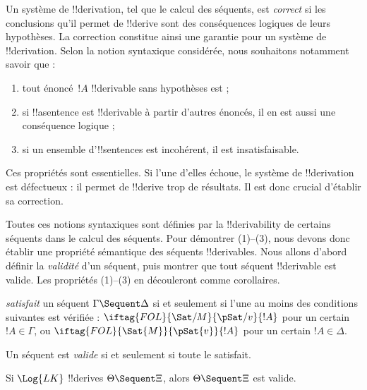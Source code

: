 \documentclass[../../../include/open-logic-section]{subfiles}
\begin{document}
      {}
      {}


\begin{explain}
Un système de !!{derivation}, tel que le calcul des séquents, est
\emph{correct} si les conclusions qu'il permet de !!{derive} sont
des conséquences logiques de leurs hypothèses. La correction constitue
ainsi une garantie pour un système de !!{derivation}. Selon la notion syntaxique
considérée, nous souhaitons notamment savoir que :
\begin{enumerate}
\item tout énoncé~$!A$ !!{derivable} sans hypothèses est
   ;
\item si !!a{sentence} est !!{derivable} à partir d'autres énoncés,
  il en est aussi une conséquence logique ;
\item si un ensemble d'!!{sentence}s est incohérent, il est insatisfaisable.
\end{enumerate}
Ces propriétés sont essentielles. Si l'une d'elles échoue, le système
de !!{derivation} est défectueux : il permet de !!{derive} trop de
résultats. Il est donc crucial d'établir sa correction.

Toutes ces notions syntaxiques sont définies par la !!{derivability}
de certains séquents dans le calcul des séquents. Pour démontrer
(1)--(3), nous devons donc établir une propriété sémantique des
séquents !!{derivable}s. Nous allons d'abord définir la \emph{validité}
d'un séquent, puis montrer que tout séquent !!{derivable} est valide.
Les propriétés (1)--(3) en découleront comme corollaires.
\end{explain}

\begin{defn}
\emph{satisfait} un séquent $\Gamma \Sequent \Delta$ si et seulement
si l'une au moins des conditions suivantes est vérifiée :
$\iftag{FOL}{\Sat/{M}}{\pSat/{v}}{!A}$ pour un certain $!A \in \Gamma$,
ou $\iftag{FOL}{\Sat{M}}{\pSat{v}}{!A}$ pour un certain $!A \in \Delta$.

Un séquent est \emph{valide} si et seulement si toute
le satisfait.
\end{defn}

\begin{thm}[Correction]
Si $\Log{LK}$ !!{derive}s $\Theta \Sequent \Xi$, alors
$\Theta \Sequent \Xi$ est valide.
\end{thm}
\end{document}
